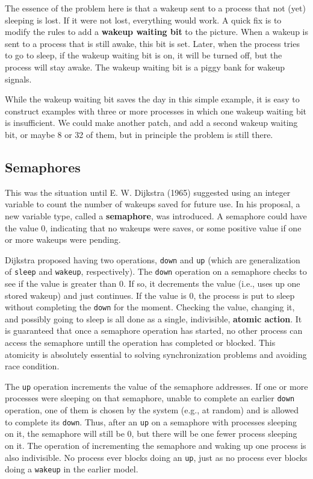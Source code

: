 \documentclass{book}
\newcommand {\kw}  [1] {\textbf{#1}}
\newcommand {\cmd} [1] {\texttt{#1}}
\begin{document}
The essence of the problem here is that a wakeup sent to a process that not (yet) sleeping is lost.
If it were not lost, everything would work.
A quick fix is to modify the rules to add a \kw{wakeup waiting bit} to the picture.
When a wakeup is sent to a process that is still awake, this bit is set.
Later, when the process tries to go to sleep, if the wakeup waiting bit is on, it will be turned off,
but the process will stay awake.
The wakeup waiting bit is a piggy bank for wakeup signals.


While the wakeup waiting bit saves the day in this simple example, 
it is easy to construct examples with three or more processes in which one wakeup waiting bit is insufficient.
We could make another patch, and add a second wakeup waiting bit, or maybe 8 or 32 of them, but in principle the problem is still there.

\subsection{Semaphores}
This was the situation until E. W. Dijkstra (1965) suggested using an integer variable to count the number of wakeups saved for future use.
In his proposal, a new variable type, called a \kw{semaphore}, was introduced.
A semaphore could have the value 0, indicating that no wakeups were saves, 
or some positive value if one or more wakeups were pending.

Dijkstra proposed having two operations, \cmd{down} and \cmd{up} 
(which are generalization of \cmd{sleep} and \cmd{wakeup}, respectively).
The \cmd{down} operation on a semaphore checks to see if the value is greater than 0.
If so, it decrements the value (i.e., uses up one stored wakeup) and just continues.
If the value is 0, the process is put to sleep without completing the \cmd{down} for the moment.
Checking the value, changing it, and possibly going  to sleep is all done as a single, indivisible, \kw{atomic action}.
It is guaranteed that once a semaphore operation has started, 
no other process can access the semaphore untill the operation has completed or blocked.
This atomicity is absolutely essential to solving synchronization problems and avoiding race condition.

The \cmd{up} operation increments the value of the semaphore addresses.
If one or more processes were sleeping on that semaphore, unable to complete an earlier \cmd{down} operation,
one of them is chosen by the system (e.g., at random) and is allowed to complete its \cmd{down}.
Thus, after an \cmd{up} on a semaphore with processes sleeping on it, the semaphore will still be 0,
but there will be one fewer process sleeping on it.
The operation of incrementing the semaphore and waking up one process is also indivisible.
No process ever blocks doing an \cmd{up}, just as no process ever blocks doing a \cmd{wakeup} in the earlier model.
\end{document}
